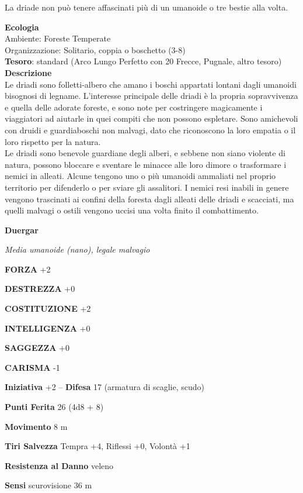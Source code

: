 \begin{multicols}{2}
La driade non può tenere affascinati più di un umanoide o tre bestie alla volta.

\textbf{Ecologia}\\
Ambiente: Foreste Temperate\\
Organizzazione: Solitario, coppia o boschetto (3-8)\\
\textbf{Tesoro}: standard (Arco Lungo Perfetto con 20 Frecce, Pugnale, altro tesoro)\\
\textbf{Descrizione}\\
Le driadi sono folletti-albero che amano i boschi appartati lontani dagli umanoidi bisognosi di legname. L'interesse principale delle driadi è la propria sopravvivenza e quella delle adorate foreste, e sono note per costringere magicamente i viaggiatori ad aiutarle in quei compiti che non possono espletare. Sono amichevoli con druidi e guardiaboschi non malvagi, dato che riconoscono la loro empatia o il loro rispetto per la natura.\\
Le driadi sono benevole guardiane degli alberi, e sebbene non siano violente di natura, possono bloccare e sventare le minacce alle loro dimore o trasformare i nemici in alleati. Alcune tengono uno o più umanoidi ammaliati nel proprio territorio per difenderlo o per sviare gli assalitori. I nemici resi inabili in genere vengono trascinati ai confini della foresta dagli alleati delle driadi e scacciati, ma quelli malvagi o ostili vengono uccisi una volta finito il combattimento.

\medskip{}\textbf{Duergar}

\textit{Media umanoide (nano), legale malvagio}

\textbf{FORZA} +2

\textbf{DESTREZZA} +0

\textbf{COSTITUZIONE} +2

\textbf{INTELLIGENZA} +0

\textbf{SAGGEZZA} +0

\textbf{CARISMA} -1

\textbf{Iniziativa} +2 -- \textbf{Difesa} 17 (armatura di scaglie, scudo)

\textbf{Punti Ferita} 26 (4d8 + 8)

\textbf{Movimento} 8 m

\textbf{Tiri Salvezza} Tempra +4, Riflessi +0, Volontà +1

\textbf{Resistenza al Danno} veleno

\textbf{Sensi} scurovisione 36 m


\end{multicols}

